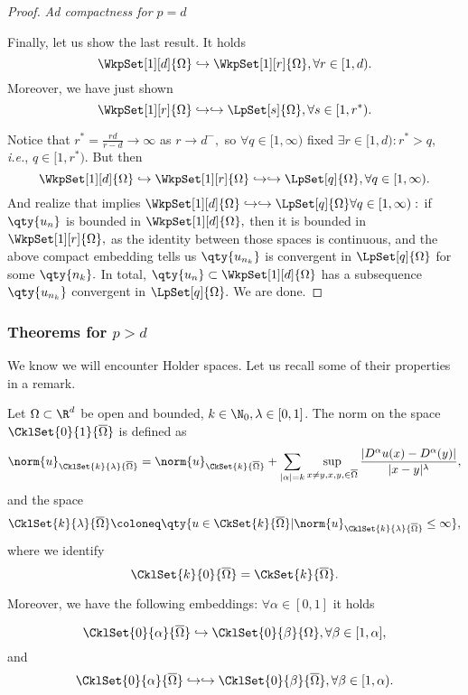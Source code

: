 \begin{proof}
	\textit{Ad compactness for $p=d$}

	Finally, let us show the last result. It holds
	\[
		\WkpSet[1][d]{\Omega} \hookrightarrow \WkpSet[1][r]{\Omega}, \forall r \in [1,d).
	\]
	Moreover, we have just shown
	\[
		\WkpSet[1][r]{\Omega} \hookrightarrow \hookrightarrow \LpSet[s]{\Omega}, \forall s \in [1,r^{*}).
	\]

	Notice that $r^{*} = \frac{rd}{r-d} \to \infty$ as $r \to d^-,$ so $\forall q \in [1,\infty)$ fixed $\exists r \in [1,d): r^{*} > q,$ \textit{i.e.}, $q \in [1, r^{*}).$ But then
	\[
		\WkpSet[1][d]{\Omega} \hookrightarrow \WkpSet[1][r]{\Omega} \hookrightarrow \hookrightarrow \LpSet[q]{\Omega}, \forall q \in [1,\infty).
	\]
	And realize that implies $\WkpSet[1][d]{\Omega} \hookrightarrow \hookrightarrow \LpSet[q]{\Omega} \forall q \in [1,\infty):$ if $\qty{u_n}$ is bounded in $\WkpSet[1][d]{\Omega},$ then it is bounded in $\WkpSet[1][r]{\Omega},$ as the identity between those spaces is continuous, and the above compact embedding tells us $\qty{u_{n_k}}$ is convergent in $\LpSet[q]{\Omega}$ for some $\qty{n_k}.$ In total, $\qty{u_n} \subset \WkpSet[1][d]{\Omega}$ has a subsequence $\qty{u_{n_k}}$ convergent in $\LpSet[q]{\Omega}.$ We are done.
\end{proof}

\subsubsection{Theorems for $p>d$}
\label{sec:emedding_p_ge_q}
We know we will encounter Holder spaces. Let us recall some of their properties in a remark.


\begin{remark}
	Let $\Omega \subset \R^{d}$ be open and bounded, $k \in \N_0, \lambda \in [0,1]$. The norm on the space $\CklSet{0}{1}{\overline{\Omega}}$ is defined as
	\[
		\norm{u}_{\CklSet{k}{\lambda}{\overline{\Omega}}} = \norm{u}_{\CkSet{k}{\overline{\Omega}}} + \sum_{|\alpha| = k}\sup_{x \neq y, x,y, \in \overline{\Omega}}\frac{|D^{\alpha}u(x) - D^{\alpha}(y)|}{|x-y|^{\lambda}},
	\]
	and the space
	\[
		\CklSet{k}{\lambda}{\overline{\Omega}} \coloneq \qty{u \in \CkSet{k}{\overline{\Omega}}| \norm{u}_{\CklSet{k}{\lambda}{\overline{\Omega}}} \leq \infty},
	\]
	where we identify
	\[
		\CklSet{k}{0}{\overline{\Omega}} = \CkSet{k}{\overline{\Omega}}.
	\]

	Moreover, we have the following embeddings: $\forall \alpha \in [0,1]$ it holds

	\[
		\CklSet{0}{\alpha}{\overline{\Omega}} \hookrightarrow \CklSet{0}{\beta}{\Omega}, \forall \beta \in [1, \alpha],
	\]
	and 
	\[
		\CklSet{0}{\alpha}{\overline{\Omega}} \hookrightarrow \hookrightarrow \CklSet{0}{\beta}{\overline{\Omega}}, \forall \beta \in [1,\alpha).
	\]


\end{remark}

